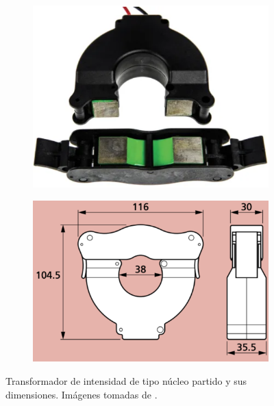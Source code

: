 \begin{figure}[h!]
	\centering
	\begin{subfigure}[b]{0.4\textwidth}
		\centering
		\includegraphics[width=.7\textwidth]{./Figures/ti_abierto}
		\caption{}
		\label{fig:ti_abierto}
	\end{subfigure}
	\centering
	\begin{subfigure}[b]{0.4\textwidth}
		\centering
		\includegraphics[width=.7\textwidth]{./Figures/ti_dimensiones}
		\caption{}
		\label{fig:ti_dimensiones}
	\end{subfigure}
	\caption{Transformador de intensidad de tipo núcleo partido y sus dimensiones. Imágenes tomadas de \citep{ct_hobut}.}
	\label{fig:ti_mosaico}
\end{figure} 

